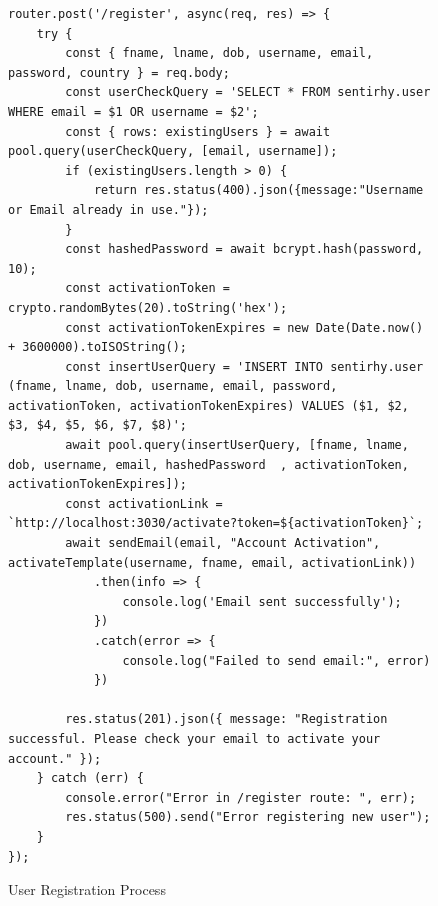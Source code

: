 \newpage

\setcounter{figure}{0}
\setcounter{table}{0}
\begin{figure}[ht!]
\begin{verbatim}
router.post('/register', async(req, res) => {
    try {
        const { fname, lname, dob, username, email, password, country } = req.body;
        const userCheckQuery = 'SELECT * FROM sentirhy.user WHERE email = $1 OR username = $2';
        const { rows: existingUsers } = await pool.query(userCheckQuery, [email, username]);
        if (existingUsers.length > 0) {
            return res.status(400).json({message:"Username or Email already in use."});
        }
        const hashedPassword = await bcrypt.hash(password, 10);
        const activationToken = crypto.randomBytes(20).toString('hex');
        const activationTokenExpires = new Date(Date.now() + 3600000).toISOString();
        const insertUserQuery = 'INSERT INTO sentirhy.user (fname, lname, dob, username, email, password, activationToken, activationTokenExpires) VALUES ($1, $2, $3, $4, $5, $6, $7, $8)';
        await pool.query(insertUserQuery, [fname, lname, dob, username, email, hashedPassword  , activationToken, activationTokenExpires]);
        const activationLink = `http://localhost:3030/activate?token=${activationToken}`;
        await sendEmail(email, "Account Activation", activateTemplate(username, fname, email, activationLink))
            .then(info => {
                console.log('Email sent successfully');
            })
            .catch(error => {
                console.log("Failed to send email:", error)
            })

        res.status(201).json({ message: "Registration successful. Please check your email to activate your account." });
    } catch (err) {
        console.error("Error in /register route: ", err);
        res.status(500).send("Error registering new user");
    }
});
\end{verbatim}
\caption{User Registration Process}
\label{fig:registering-user}
\end{figure}

\newpage

